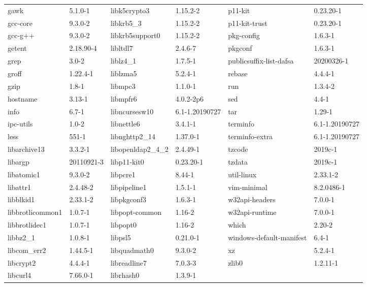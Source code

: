 \documentclass[11pt, english, openany]{report}
\begin{document}
\begin{appendices}
\begin{itemize}
\begin{table}[h]
\begin{center}
\begin{tabular}{ll|ll|ll}
			gawk & 5.1.0-1 & 	libk5crypto3 & 1.15.2-2 & 	p11-kit & 0.23.20-1 \\
			gcc-core & 9.3.0-2 & 	libkrb5\_3 & 1.15.2-2 & 	p11-kit-trust & 0.23.20-1 \\
			gcc-g++ & 9.3.0-2 & 	libkrb5support0 & 1.15.2-2 & 	pkg-config & 1.6.3-1 \\
			getent & 2.18.90-4 & 	libltdl7 & 2.4.6-7 & 	pkgconf & 1.6.3-1 \\
			grep & 3.0-2 & 	liblz4\_1 & 1.7.5-1 & 	publicsuffix-list-dafsa & 20200326-1 \\
			groff & 1.22.4-1 & 	liblzma5 & 5.2.4-1 & 	rebase & 4.4.4-1 \\
			gzip & 1.8-1 & 	libmpc3 & 1.1.0-1 & 	run & 1.3.4-2 \\
			hostname & 3.13-1 & 	libmpfr6 & 4.0.2-2p6 & 	sed & 4.4-1 \\
			info & 6.7-1 & 	libncursesw10 & 6.1-1.20190727 & 	tar & 1.29-1 \\
			ipc-utils & 1.0-2 & 	libnettle6 & 3.4.1-1 & 	terminfo & 6.1-1.20190727 \\
			less & 551-1 & 	libnghttp2\_14 & 1.37.0-1 & 	terminfo-extra & 6.1-1.20190727 \\
			libarchive13 & 3.3.2-1 & 	libopenldap2\_4\_2 & 2.4.49-1 & 	tzcode & 2019c-1 \\
			libargp & 20110921-3 & 	libp11-kit0 & 0.23.20-1 & 	tzdata & 2019c-1 \\
			libatomic1 & 9.3.0-2 & 	libpcre1 & 8.44-1 & 	util-linux & 2.33.1-2 \\
			libattr1 & 2.4.48-2 & 	libpipeline1 & 1.5.1-1 & 	vim-minimal & 8.2.0486-1 \\
			libblkid1 & 2.33.1-2 & 	libpkgconf3 & 1.6.3-1 & 	w32api-headers & 7.0.0-1 \\
			libbrotlicommon1 & 1.0.7-1 & 	libpopt-common & 1.16-2 & 	w32api-runtime & 7.0.0-1 \\
			libbrotlidec1 & 1.0.7-1 & 	libpopt0 & 1.16-2 & 	which & 2.20-2 \\
			libbz2\_1 & 1.0.8-1 & 	libpsl5 & 0.21.0-1 & 	windows-default-manifest & 6.4-1 \\
			libcom\_err2 & 1.44.5-1 & 	libquadmath0 & 9.3.0-2 & 	xz & 5.2.4-1 \\
			libcrypt2 & 4.4.4-1 & 	libreadline7 & 7.0.3-3 & 	zlib0 & 1.2.11-1 \\
			libcurl4 & 7.66.0-1 & 	librhash0 & 1.3.9-1 & 	\\

		\end{tabular}
	\end{center}
\end{table}
\end{itemize}


\end{appendices}
\end{document}
